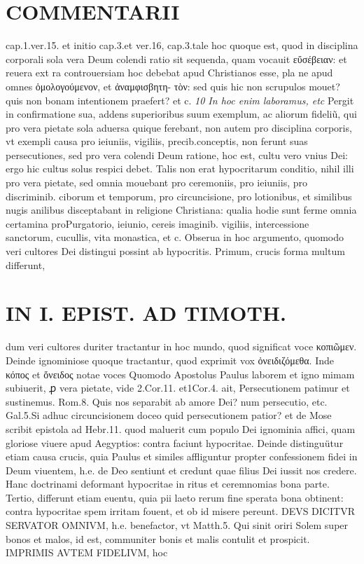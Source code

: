 \documentclass{article}
\begin{document}
\begin{pages}
\section*{COMMENTARII }
\marginpar{[ p.102 ]}\pstart cap.1.ver.15. et initio cap.3.et ver.16, cap.3.tale hoc quoque est, quod in disciplina corporali sola vera Deum colendi ratio sit sequenda, quam vocauit εὔσέβειαν: et reuera ext ra controuersiam hoc debebat apud Christianos esse, pla ne apud omnes ὁμολογούμενον, et ἀναμφισβητη- τὸν: sed quis hic non scrupulos mouet? quis non bonam intentionem praefert? et c.  \pend
\textit{10 In hoc enim laboramus, etc }\pstart Pergit in confirmatione sua, addens superioribus suum exemplum, ac aliorum fideliũ, qui pro vera pietate sola aduersa quique ferebant, non autem pro disciplina corporis, vt exempli causa pro ieiuniis, vigiliis, precib.conceptis, non ferunt suas persecutiones, sed pro vera colendi Deum ratione, hoc est, cultu vero vnius Dei: ergo hic cultus solus respici debet. Talis non erat hypocritarum conditio, nihil illi pro vera pietate, sed omnia mouebant pro ceremoniis, pro ieiuniis, pro discriminib. ciborum et temporum, pro circuncisione, pro lotionibus, et similibus nugis anilibus disceptabant in religione Christiana: qualia hodie sunt ferme omnia certamina proPurgatorio, ieiunio, cereis imaginib. vigiliis, intercessione sanctorum, cucullis, vita monastica, et c. Obserua in hoc argumento, quomodo veri cultores Dei distingui possint ab hypocritis. Primum, crucis forma multum differunt,  \pend
\section*{IN I. EPIST. AD TIMOTH. }
\marginpar{[ p.103 ]}\pstart dum veri cultores duriter tractantur in hoc mundo, quod significat voce κοπιῶμεν. Deinde ignominiose quoque tractantur, quod exprimit vox ὀνειδιζόμεθα. Inde κόπος et ὄνειδος notae voces  \pend\pstart Quomodo Apostolus Paulus laborem et igno mimam subiuerit, ꝓ vera pietate, vide 2.Cor.11. et1Cor.4. ait, Persecutionem patimur et sustinemus. Rom.8. Quis nos separabit ab amore Dei? num persecutio, etc. Gal.5.Si adhuc circuncisionem doceo quid persecutionem patior? et de Mose scribit epistola ad Hebr.11. quod maluerit cum populo Dei ignominia affici, quam gloriose viuere apud Aegyptios: contra faciunt hypocritae.  \pend\pstart Deinde distinguütur etiam causa crucis, quia Paulus et similes affliguntur propter confessionem fidei in Deum viuentem, h.e. de Deo sentiunt et credunt quae filius Dei iussit nos credere. Hanc doctrinami deformant hypocritae in ritus et ceremnomias bona parte.  \pend\pstart Tertio, differunt etiam euentu, quia pii laeto rerum fine sperata bona obtinent: contra hypocritae spem irritam fouent, et ob id misere pereunt.  \pend\pstart DEVS DICITVR SERVATOR OMNIVM, h.e. benefactor, vt Matth.5. Qui sinit oriri Solem super bonos et malos, id est, communiter bonis et malis contulit et prospicit. IMPRIMIS AVTEM FIDELIVM, hoc  \pend

\end{pages}
\end{document}
